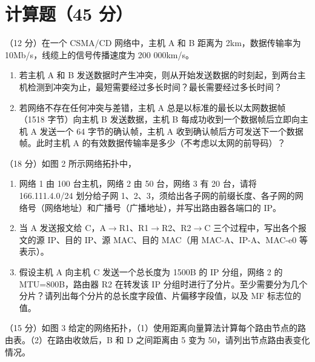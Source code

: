 \section{计算题（45 分）}
\begin{question}[index=1]
（12 分）在一个 CSMA/CD 网络中，主机 A 和 B 距离为 2km，数据传输率为 10Mb/s，线缆上的信号传播速度为 200 000km/s。
\begin{enumerate}
\item 若主机 A 和 B 发送数据时产生冲突，则从开始发送数据的时刻起，到两台主机检测到冲突为止，最短需要经过多长时间？最长需要经过多长时间？
\item 若网络不存在任何冲突与差错，主机 A 总是以标准的最长以太网数据帧（1518 字节）向主机 B 发送数据，主机 B 每成功收到一个数据帧后立即向主机 A 发送一个 64 字节的确认帧，主机 A 收到确认帧后方可发送下一个数据帧。此时主机 A 的有效数据传输率是多少（不考虑以太网的前导码）？
\end{enumerate}
\end{question}
\begin{question}[index=2]
（18 分）如图 2 所示网络拓扑中，
\begin{enumerate}
\item 网络 1 由 100 台主机，网络 2 由 50 台，网络 3 有 20 台，请将 166.111.4.0/24 划分给子网 1、2、3，须给出各子网的前缀长度、各子网的网络号（网络地址）和广播号（广播地址），并写出路由器各端口的 IP。
\item 当 A 发送报文给 C，A$\to$R1、R1$\to$R2、R2$\to$C 三个过程中，写出各个报文的源 IP、目的 IP、源 MAC、目的 MAC（用 MAC-A、IP-A、MAC-e0 等表示）。
\item 假设主机 A 向主机 C 发送一个总长度为 1500B 的 IP 分组，网络 2 的 MTU=800B，路由器 R2 在转发该 IP 分组时进行了分片。至少需要分为几个分片？请列出每个分片的总长度字段值、片偏移字段值，以及 MF 标志位的值。
\end{enumerate}
\end{question}
\begin{question}[index=3]
（15 分）如图 3 给定的网络拓扑，（1）使用距离向量算法计算每个路由节点的路由表。（2）在路由收敛后，B 和 D 之间距离由 5 变为 50，请列出节点路由表变化情况。
\par\smallskip\noindent{}
\par\noindent{}
\end{question}

